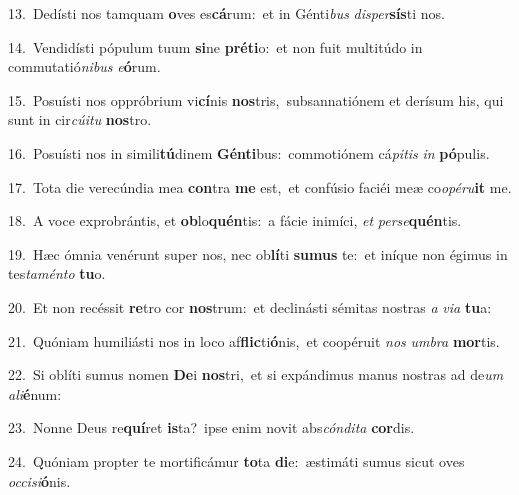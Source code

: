 {\numbfont\textcolor{\numbcolor}{13.}}~Dedísti nos tamquam \textbf{o}\-ves es\-\textbf{cá}\-rum:~\star et in Génti\textit{bus} \textit{di}\-\textit{sper}\textbf{sís}ti nos.\par
{\numbfont\textcolor{\numbcolor}{14.}}~Vendidísti pópulum tuum \textbf{si}\-ne \textbf{pré}\-\textbf{ti}o:~\star et non fuit multitúdo in commutatió\-\textit{ni}\-\textit{bus} \textit{e}\-\textbf{ó}rum.\par
{\numbfont\textcolor{\numbcolor}{15.}}~Posuísti nos oppróbrium vi\-\textbf{cí}\-nis \textbf{nos}\-tris,~\star subsannatiónem et derísum his, qui sunt in cir\-\textit{cú}\-\textit{i}\textit{tu} \textbf{nos}\-tro.\par
{\numbfont\textcolor{\numbcolor}{16.}}~Posuísti nos in simili\-\textbf{tú}\-dinem \textbf{Gén}\-\textbf{ti}bus:~\star commotiónem cá\-\textit{pi}\-\textit{tis} \textit{in} \textbf{pó}\-pulis.\par
{\numbfont\textcolor{\numbcolor}{17.}}~Tota die verecúndia mea \textbf{con}\-tra \textbf{me} est,~\star et confúsio faciéi meæ co\-\textit{o}\-\textit{pé}\textit{ru}\textbf{it} me.\par
{\numbfont\textcolor{\numbcolor}{18.}}~A voce exprobrántis, et \textbf{ob}\-lo\-\textbf{quén}\-tis:~\star a fácie inimíci, \textit{et} \textit{per}\-\textit{se}\textbf{quén}tis.\par
{\numbfont\textcolor{\numbcolor}{19.}}~Hæc ómnia venérunt super nos, nec ob\-\textbf{lí}\-ti \textbf{su}\-\textbf{mus} te:~\star et iníque non égimus in tes\-\textit{ta}\-\textit{mén}\textit{to} \textbf{tu}\-o.\par
{\numbfont\textcolor{\numbcolor}{20.}}~Et non recéssit \textbf{re}\-tro cor \textbf{nos}\-trum:~\star et declinásti sémitas nostras \textit{a} \textit{vi}\-\textit{a} \textbf{tu}\-a:\par
{\numbfont\textcolor{\numbcolor}{21.}}~Quóniam humiliásti nos in loco af\-\textbf{flic}\-ti\-\textbf{ó}\-nis,~\star et coopéruit \textit{nos} \textit{um}\-\textit{bra} \textbf{mor}\-tis.\par
{\numbfont\textcolor{\numbcolor}{22.}}~Si oblíti sumus nomen \textbf{De}\-i \textbf{nos}\-tri,~\star et si expándimus manus nostras ad de\textit{um} \textit{a}\-\textit{li}\textbf{é}num:\par
{\numbfont\textcolor{\numbcolor}{23.}}~Nonne Deus re\-\textbf{quí}\-ret \textbf{is}\-ta?~\star ipse enim novit abs\-\textit{cón}\-\textit{di}\textit{ta} \textbf{cor}\-dis.\par
{\numbfont\textcolor{\numbcolor}{24.}}~Quóniam propter te mortificámur \textbf{to}\-ta \textbf{di}\-e:~\star æstimáti sumus sicut oves \textit{oc}\-\textit{ci}\textit{si}\textbf{ó}nis.\par
